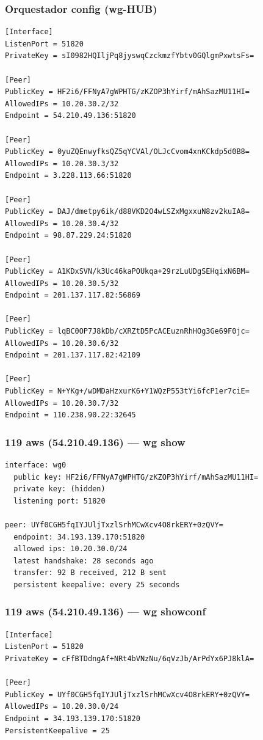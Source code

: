 \documentclass[11pt,a4paper]{article}
\begin{document}
\subsubsection*{Orquestador config (wg-HUB)}
\begin{lstlisting}
[Interface]
ListenPort = 51820
PrivateKey = sI0982HQIljPq8jyswqCzckmzfYbtv0GQlgmPxwtsFs=

[Peer]
PublicKey = HF2i6/FFNyA7gWPHTG/zKZOP3hYirf/mAhSazMU11HI=
AllowedIPs = 10.20.30.2/32
Endpoint = 54.210.49.136:51820

[Peer]
PublicKey = 0yuZQEnwyfksQZ5qYCVAl/OLJcCvom4xnKCkdp5d0B8=
AllowedIPs = 10.20.30.3/32
Endpoint = 3.228.113.66:51820

[Peer]
PublicKey = DAJ/dmetpy6ik/d88VKD2O4wLSZxMgxxuN8zv2kuIA8=
AllowedIPs = 10.20.30.4/32
Endpoint = 98.87.229.24:51820

[Peer]
PublicKey = A1KDxSVN/k3Uc46kaPOUkqa+29rzLuUDgSEHqixN6BM=
AllowedIPs = 10.20.30.5/32
Endpoint = 201.137.117.82:56869

[Peer]
PublicKey = lqBC0OP7J8kDb/cXRZtD5PcACEuznRhHOg3Ge69F0jc=
AllowedIPs = 10.20.30.6/32
Endpoint = 201.137.117.82:42109

[Peer]
PublicKey = N+YKg+/wDMDaHzxurK6+Y1WQzP553tYi6fcP1er7ciE=
AllowedIPs = 10.20.30.7/32
Endpoint = 110.238.90.22:32645

\end{lstlisting}

\subsubsection*{119 aws (54.210.49.136) — wg show}
\begin{lstlisting}
interface: wg0
  public key: HF2i6/FFNyA7gWPHTG/zKZOP3hYirf/mAhSazMU11HI=
  private key: (hidden)
  listening port: 51820

peer: UYf0CGH5fqIYJUljTxzlSrhMCwXcv4O8rkERY+0zQVY=
  endpoint: 34.193.139.170:51820
  allowed ips: 10.20.30.0/24
  latest handshake: 28 seconds ago
  transfer: 92 B received, 212 B sent
  persistent keepalive: every 25 seconds

\end{lstlisting}

\subsubsection*{119 aws (54.210.49.136) — wg showconf}
\begin{lstlisting}
[Interface]
ListenPort = 51820
PrivateKey = cFfBTDdngAf+NRt4bVNzNu/6qVzJb/ArPdYx6PJ8klA=

[Peer]
PublicKey = UYf0CGH5fqIYJUljTxzlSrhMCwXcv4O8rkERY+0zQVY=
AllowedIPs = 10.20.30.0/24
Endpoint = 34.193.139.170:51820
PersistentKeepalive = 25

\end{lstlisting}
\end{document}
